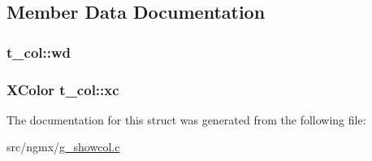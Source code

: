 \subsection{\-Member \-Data \-Documentation}
\hypertarget{structt__col_a98331be174931694f46de4bcaeb9536b}{
\subsubsection[{wd}]{ {\bf t\-\_\-col\-::wd}}}\label{structt__col_a98331be174931694f46de4bcaeb9536b}
\hypertarget{structt__col_aa83446cf0a1dd0fc97a840c74bfbdc76}{
\subsubsection[{xc}]{\setlength{\rightskip}{0pt plus 5cm}\-X\-Color {\bf t\-\_\-col\-::xc}}}\label{structt__col_aa83446cf0a1dd0fc97a840c74bfbdc76}


\-The documentation for this struct was generated from the following file\-:\begin{DoxyCompactItemize}
\item 
src/ngmx/\hyperlink{g__showcol_8c}{g\-\_\-showcol.\-c}\end{DoxyCompactItemize}
